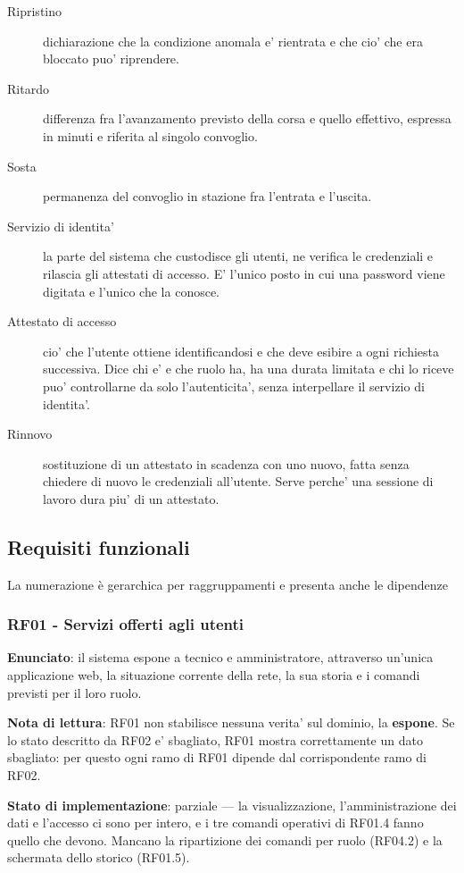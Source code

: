 \documentclass[11pt]{article}
\begin{document}
\begin{description}
\item[{Ripristino}] dichiarazione che la condizione anomala e' rientrata e che cio' che era bloccato puo'
riprendere.
\item[{Ritardo}] differenza fra l'avanzamento previsto della corsa e quello effettivo, espressa in
minuti e riferita al singolo convoglio.
\item[{Sosta}] permanenza del convoglio in stazione fra l'entrata e l'uscita.
\item[{Servizio di identita'}] la parte del sistema che custodisce gli utenti, ne verifica le
credenziali e rilascia gli attestati di accesso. E' l'unico posto in cui una password viene
digitata e l'unico che la conosce.
\item[{Attestato di accesso}] cio' che l'utente ottiene identificandosi e che deve esibire a ogni
richiesta successiva. Dice chi e' e che ruolo ha, ha una durata limitata e chi lo riceve puo'
controllarne da solo l'autenticita', senza interpellare il servizio di identita'.
\item[{Rinnovo}] sostituzione di un attestato in scadenza con uno nuovo, fatta senza chiedere di
nuovo le credenziali all'utente. Serve perche' una sessione di lavoro dura piu' di un
attestato.
\end{description}
\subsection{Requisiti funzionali}
\label{sec:orge5dbd4c}
La numerazione è gerarchica per raggruppamenti e presenta anche le dipendenze
\subsubsection{RF01 - Servizi offerti agli utenti}
\label{sec:orgead8e72}

\textbf{Enunciato}: il sistema espone a tecnico e amministratore, attraverso un'unica applicazione web, la
situazione corrente della rete, la sua storia e i comandi previsti per il loro ruolo.

\textbf{Nota di lettura}: RF01 non stabilisce nessuna verita' sul dominio, la \textbf{espone}. Se lo stato
descritto da RF02 e' sbagliato, RF01 mostra correttamente un dato sbagliato: per questo ogni ramo di
RF01 dipende dal corrispondente ramo di RF02.

\textbf{Stato di implementazione}: parziale — la visualizzazione, l'amministrazione dei dati e l'accesso
ci sono per intero, e i tre comandi operativi di RF01.4 fanno quello che devono. Mancano la
ripartizione dei comandi per ruolo (RF04.2) e la schermata dello storico (RF01.5).
\end{document}
